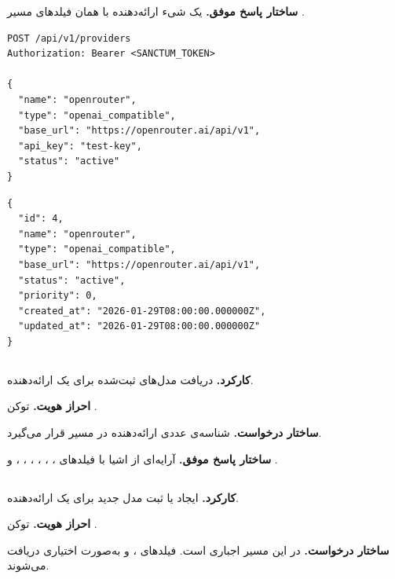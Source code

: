 \textbf{ساختار پاسخ موفق.} یک شیء ارائه‌دهنده با همان فیلدهای مسیر
.

\begin{latin}
\begin{lstlisting}[style=jsonStyle]
POST /api/v1/providers
Authorization: Bearer <SANCTUM_TOKEN>

{
  "name": "openrouter",
  "type": "openai_compatible",
  "base_url": "https://openrouter.ai/api/v1",
  "api_key": "test-key",
  "status": "active"
}
\end{lstlisting}
\end{latin}


\begin{latin}
\begin{lstlisting}[style=jsonStyle]
{
  "id": 4,
  "name": "openrouter",
  "type": "openai_compatible",
  "base_url": "https://openrouter.ai/api/v1",
  "status": "active",
  "priority": 0,
  "created_at": "2026-01-29T08:00:00.000000Z",
  "updated_at": "2026-01-29T08:00:00.000000Z"
}
\end{lstlisting}
\end{latin}


\subsection{}
\textbf{کارکرد.} دریافت مدل‌های ثبت‌شده برای یک ارائه‌دهنده.

\textbf{احراز هویت.} توکن .

\textbf{ساختار درخواست.} شناسه‌ی عددی ارائه‌دهنده در مسیر قرار می‌گیرد.

\textbf{ساختار پاسخ موفق.} آرایه‌ای از اشیا با فیلدهای ،
، ، ،
، ،  و
.

\subsection{}
\textbf{کارکرد.} ایجاد یا ثبت مدل جدید برای یک ارائه‌دهنده.

\textbf{احراز هویت.} توکن .

\textbf{ساختار درخواست.} در این مسیر  اجباری است.
فیلدهای ،  و 
به‌صورت اختیاری دریافت می‌شوند.

